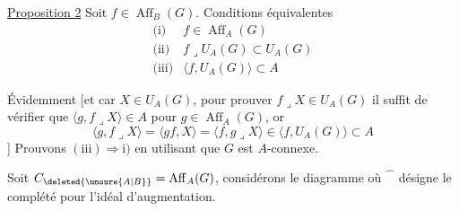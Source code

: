 \uline{Proposition 2} Soit $f\in\operatorname{Aff}_B(G)$.  Conditions équivalentes
\[
\begin{array}{ll}
\text{(i)}&f\in\operatorname{Aff}_A(G)\\
\text{(ii)}&f\mathbin{\lrcorner}U_A(G)\subset U_A(G)\\
\text{(iii)}&\langle f,U_A(G)\rangle\subset A
\end{array}
\]
\margin{\unsure{)}}

Évidemment
[et
car  $X\in U_A(G)$, pour prouver $f\mathbin{\lrcorner}X\in U_A(G)$ il suffit  de vérifier que $\langle g,f\mathbin{\lrcorner}X\rangle\in A$ pour $g\in\operatorname{Aff}_A(G)$, or
\[
\langle g,f\mathbin{\lrcorner}X\rangle=\langle gf,X\rangle=\langle f,g\mathbin{\lrcorner}X\rangle
\in\langle f,U_A(G)\rangle\subset A
\]
] Prouvons $(\mathrm{iii})\Rightarrow\mathrm{i})$ en utilisant que $G$ est $A$-connexe.

Soit $C_{\deleted{\unsure{A|B}}}=\operatorname{Aff}_A(G)$, considérons le diagramme
où $\widehat{\phantom C}$ désigne le  complété pour l'idéal d'augmentation.
